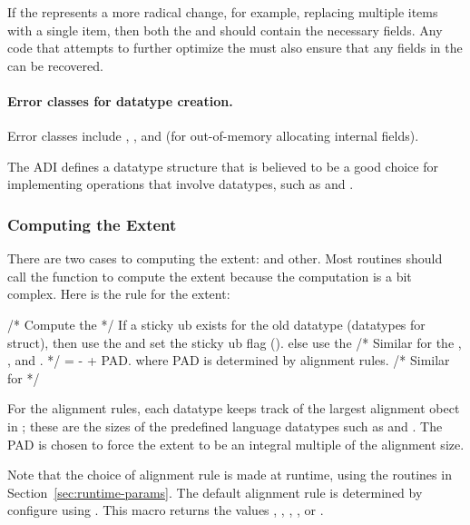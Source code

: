 \documentclass{article}
\begin{document}
\begin{enumerate}
  If the  represents a more radical change, for example,
  replacing multiple items with a single item, then both the 
  and  should contain the necessary fields.  Any code that
  attempts to further optimize the  must also ensure that
  any  fields in the  can be recovered.

\end{enumerate}

\paragraph{Error classes for datatype creation.}
Error classes include ,
, and  (for
out-of-memory allocating internal fields).

The ADI defines a datatype structure that is believed to be a good
choice for implementing operations that involve datatypes, such as
 and .

\subsubsection{Computing the Extent}
There are two cases to computing the extent: 
and other.  Most routines should call the function
 to compute the extent because the
computation is a bit complex.  Here is the rule for the extent:
\begin{algorithm}
/* Compute the  */
If a sticky ub exists for the old datatype (datatypes for struct), then
    use the  and set the sticky ub flag
    ().
else
    use the 
/* Similar for the ,
   ,
     and
   . */
 =  -  + PAD.
where PAD is determined by alignment rules.  
/* Similar for  */

For the alignment rules, each datatype keeps track of the largest
alignment obect in ; these are the
sizes of the predefined language datatypes such as  and
.  The PAD is chosen to force the extent to be an integral
multiple of the alignment size.
\end{algorithm}
Note that the choice of alignment rule is made at runtime, using the
routines in Section~\ref{sec:runtime-params}.  The default alignment
rule is determined by configure using .
This macro returns the values , ,
, , or .
\end{document}
